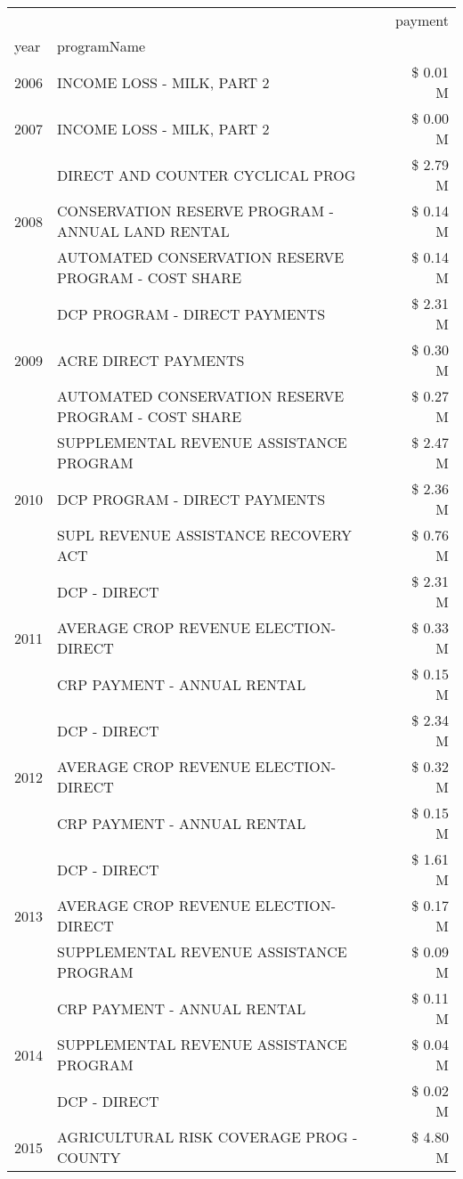 \begin{tabular}{llr}
\toprule
 &  & payment \\
year & programName &  \\
\midrule
2006 & INCOME LOSS - MILK, PART 2 & \$ 0.01 M \\
\cline{1-3}
2007 & INCOME LOSS - MILK, PART 2 & \$ 0.00 M \\
\cline{1-3}
\multirow[t]{3}{*}{2008} & DIRECT AND COUNTER CYCLICAL PROG & \$ 2.79 M \\
 & CONSERVATION RESERVE PROGRAM - ANNUAL LAND RENTAL & \$ 0.14 M \\
 & AUTOMATED CONSERVATION RESERVE PROGRAM - COST SHARE & \$ 0.14 M \\
\cline{1-3}
\multirow[t]{3}{*}{2009} & DCP PROGRAM - DIRECT PAYMENTS & \$ 2.31 M \\
 & ACRE DIRECT PAYMENTS & \$ 0.30 M \\
 & AUTOMATED CONSERVATION RESERVE PROGRAM - COST SHARE & \$ 0.27 M \\
\cline{1-3}
\multirow[t]{3}{*}{2010} & SUPPLEMENTAL REVENUE ASSISTANCE PROGRAM & \$ 2.47 M \\
 & DCP PROGRAM - DIRECT PAYMENTS & \$ 2.36 M \\
 & SUPL REVENUE ASSISTANCE RECOVERY ACT & \$ 0.76 M \\
\cline{1-3}
\multirow[t]{3}{*}{2011} & DCP - DIRECT & \$ 2.31 M \\
 & AVERAGE CROP REVENUE ELECTION-DIRECT & \$ 0.33 M \\
 & CRP PAYMENT - ANNUAL RENTAL & \$ 0.15 M \\
\cline{1-3}
\multirow[t]{3}{*}{2012} & DCP - DIRECT & \$ 2.34 M \\
 & AVERAGE CROP REVENUE ELECTION-DIRECT & \$ 0.32 M \\
 & CRP PAYMENT - ANNUAL RENTAL & \$ 0.15 M \\
\cline{1-3}
\multirow[t]{3}{*}{2013} & DCP - DIRECT & \$ 1.61 M \\
 & AVERAGE CROP REVENUE ELECTION-DIRECT & \$ 0.17 M \\
 & SUPPLEMENTAL REVENUE ASSISTANCE PROGRAM & \$ 0.09 M \\
\cline{1-3}
\multirow[t]{3}{*}{2014} & CRP PAYMENT - ANNUAL RENTAL & \$ 0.11 M \\
 & SUPPLEMENTAL REVENUE ASSISTANCE PROGRAM & \$ 0.04 M \\
 & DCP - DIRECT & \$ 0.02 M \\
\cline{1-3}
\multirow[t]{3}{*}{2015} & AGRICULTURAL RISK COVERAGE PROG - COUNTY & \$ 4.80 M \\

\end{tabular}
